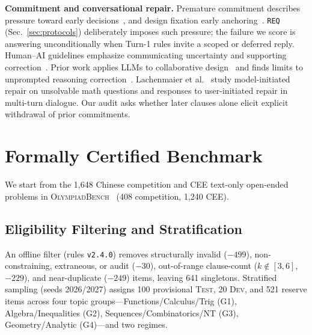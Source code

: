 \documentclass[conference,letterpaper,10pt]{IEEEtran}
\newcommand{\pREQ}{\texttt{REQ}}
\begin{document}
\textbf{Commitment and conversational repair.} Premature commitment describes pressure toward early decisions~\cite{ref23,ref24}, and design fixation early anchoring~\cite{ref25}. \pREQ{} (Sec.~\ref{sec:protocols}) deliberately imposes such pressure; the failure we score is answering unconditionally when Turn-1 rules invite a scoped or deferred reply. Human--AI guidelines emphasize communicating uncertainty and supporting correction~\cite{ref7,ref14,ref15}. Prior work applies LLMs to collaborative design~\cite{ref21} and finds limits to unprompted reasoning correction~\cite{ref26}. Lachenmaier et al.~\cite{ref30} study model-initiated repair on unsolvable math questions and responses to user-initiated repair in multi-turn dialogue. Our audit asks whether later clauses alone elicit explicit withdrawal of prior commitments.

\section{Formally Certified Benchmark}\label{sec:benchmark}

We start from the 1,648 Chinese competition and CEE text-only open-ended problems in \textsc{OlympiadBench}~\cite{ref6} (408 competition, 1,240 CEE).

\subsection{Eligibility Filtering and Stratification}
An offline filter (rules \texttt{v2.4.0}) removes structurally invalid ($-499$), non-constraining, extraneous, or audit ($-30$), out-of-range clause-count ($k{\notin}[3,6]$, $-229$), and near-duplicate ($-249$) items, leaving 641 singletons. Stratified sampling (seeds 2026/2027) assigns 100 provisional \textsc{Test}, 20 \textsc{Dev}, and 521 reserve items across four topic groups---Functions/Calculus/Trig (G1), Algebra/Inequalities (G2), Sequences/Combinatorics/NT (G3), Geometry/Analytic (G4)---and two regimes.
\end{document}
